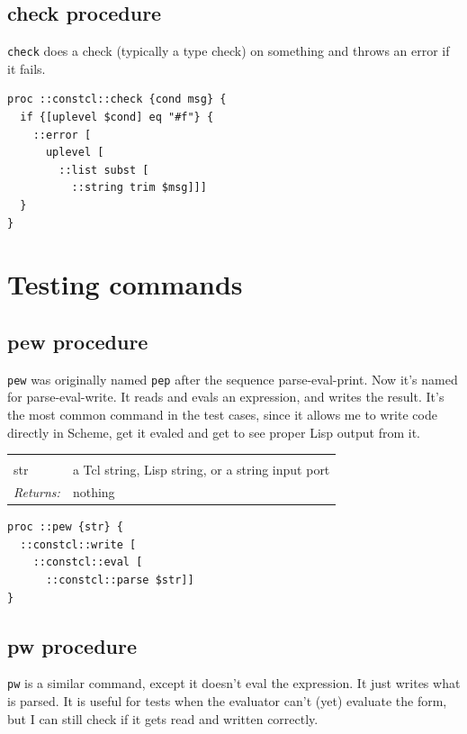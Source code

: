 \documentclass[twoside,9pt]{report}
\begin{document}
\subsection{check procedure}
\label{check-procedure}


\texttt{check} does a check (typically a type check) on something and throws an error if it fails.

\begin{lstlisting}
proc ::constcl::check {cond msg} {
  if {[uplevel $cond] eq "#f"} {
    ::error [
      uplevel [
        ::list subst [
          ::string trim $msg]]]
  }
}
\end{lstlisting}
\section{Testing commands}
\label{testing-commands}
\subsection{pew procedure}
\label{pew-procedure}


\texttt{pew} was originally named \texttt{pep} after the sequence parse-eval-print. Now it's named for parse-eval-write. It reads and evals an expression, and writes the result. It's the most common command in the test cases, since it allows me to write code directly in Scheme, get it evaled and get to see proper Lisp output from it.

\noindent\begin{tabular}{ |p{1.9cm} p{8cm}| }
\hline
\rowcolor[HTML]{CCCCCC} \multicolumn{2}{|l|}{\bf pew (internal)} \\
str & a Tcl string, Lisp string, or a string input port \\
\textit{Returns:} & nothing \\
\hline
\end{tabular}
\begin{lstlisting}
proc ::pew {str} {
  ::constcl::write [
    ::constcl::eval [
      ::constcl::parse $str]]
}
\end{lstlisting}
\subsection{pw procedure}
\label{pw-procedure}


\texttt{pw} is a similar command, except it doesn't eval the expression. It just writes what is parsed. It is useful for tests when the evaluator can't (yet) evaluate the form, but I can still check if it gets read and written correctly.
\end{document}
